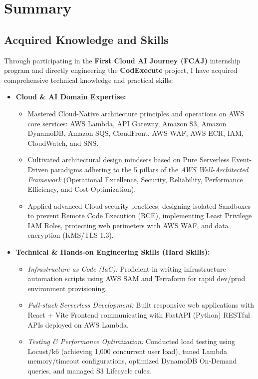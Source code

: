 \documentclass[a4paper]{article}
\begin{document}
\newpage
\section{Summary}

\subsection{Acquired Knowledge and Skills}

Through participating in the \textbf{First Cloud AI Journey (FCAJ)} internship program and directly engineering the \textbf{CodExecute} project, I have acquired comprehensive technical knowledge and practical skills:

\begin{itemize}
    \item \textbf{Cloud \& AI Domain Expertise:}
    \begin{itemize}
        \item Mastered Cloud-Native architecture principles and operations on AWS core services: AWS Lambda, API Gateway, Amazon S3, Amazon DynamoDB, Amazon SQS, CloudFront, AWS WAF, AWS ECR, IAM, CloudWatch, and SNS.
        \item Cultivated architectural design mindsets based on Pure Serverless Event-Driven paradigms adhering to the 5 pillars of the \textit{AWS Well-Architected Framework} (Operational Excellence, Security, Reliability, Performance Efficiency, and Cost Optimization).
        \item Applied advanced Cloud security practices: designing isolated Sandboxes to prevent Remote Code Execution (RCE), implementing Least Privilege IAM Roles, protecting web perimeters with AWS WAF, and data encryption (KMS/TLS 1.3).
    \end{itemize}

    \item \textbf{Technical \& Hands-on Engineering Skills (Hard Skills):}
    \begin{itemize}
        \item \textit{Infrastructure as Code (IaC):} Proficient in writing infrastructure automation scripts using AWS SAM and Terraform for rapid dev/prod environment provisioning.
        \item \textit{Full-stack Serverless Development:} Built responsive web applications with React + Vite Frontend communicating with FastAPI (Python) RESTful APIs deployed on AWS Lambda.
        \item \textit{Testing \& Performance Optimization:} Conducted load testing using Locust/k6 (achieving 1,000 concurrent user load), tuned Lambda memory/timeout configurations, optimized DynamoDB On-Demand queries, and managed S3 Lifecycle rules.
    \end{itemize}


\end{itemize}
\end{document}
